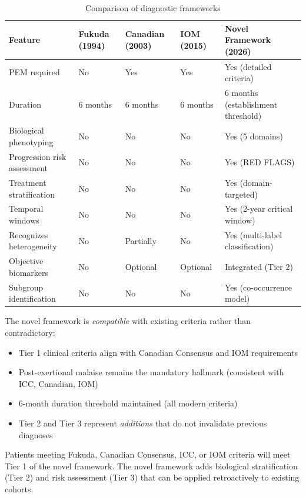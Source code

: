 \begin{table}[htbp]
\centering
\caption{Comparison of diagnostic frameworks}
\label{tab:framework-comparison}
\begin{tabular}{p{3.5cm}p{2cm}p{2cm}p{2cm}p{2.5cm}}
\toprule
\textbf{Feature} & \textbf{Fukuda (1994)} & \textbf{Canadian (2003)} & \textbf{IOM (2015)} & \textbf{Novel Framework (2026)} \\
\midrule
PEM required & No & Yes & Yes & Yes (detailed criteria) \\
\addlinespace
Duration & 6 months & 6 months & 6 months & 6 months (establishment threshold) \\
\addlinespace
Biological phenotyping & No & No & No & Yes (5 domains) \\
\addlinespace
Progression risk assessment & No & No & No & Yes (RED FLAGS) \\
\addlinespace
Treatment stratification & No & No & No & Yes (domain-targeted) \\
\addlinespace
Temporal windows & No & No & No & Yes (2-year critical window) \\
\addlinespace
Recognizes heterogeneity & No & Partially & No & Yes (multi-label classification) \\
\addlinespace
Objective biomarkers & No & Optional & Optional & Integrated (Tier 2) \\
\addlinespace
Subgroup identification & No & No & No & Yes (co-occurrence model) \\
\bottomrule
\end{tabular}
\end{table}

\begin{observation}
The novel framework is \textit{compatible} with existing criteria rather than contradictory:
\begin{itemize}
    \item Tier 1 clinical criteria align with Canadian Consensus and IOM requirements
    \item Post-exertional malaise remains the mandatory hallmark (consistent with ICC, Canadian, IOM)
    \item 6-month duration threshold maintained (all modern criteria)
    \item Tier 2 and Tier 3 represent \textit{additions} that do not invalidate previous diagnoses
\end{itemize}

Patients meeting Fukuda, Canadian Consensus, ICC, or IOM criteria will meet Tier 1 of the novel framework. The novel framework adds biological stratification (Tier 2) and risk assessment (Tier 3) that can be applied retroactively to existing cohorts.
\end{observation}

